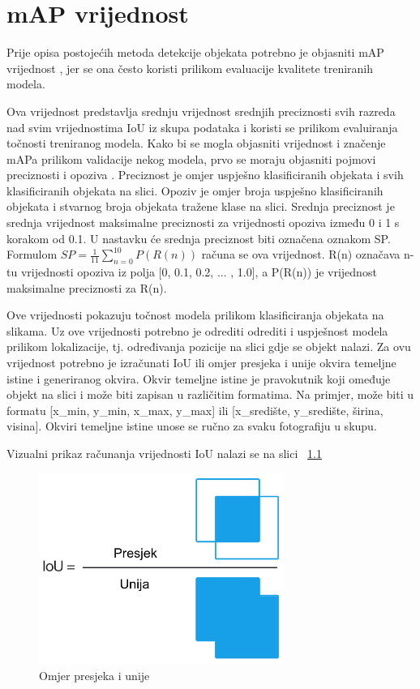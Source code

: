 \chapter{mAP vrijednost}

Prije opisa postojećih metoda detekcije objekata potrebno je objasniti mAP vrijednost , jer se ona često koristi prilikom evaluacije
kvalitete treniranih modela.

Ova vrijednost predstavlja srednju vrijednost srednjih preciznosti svih razreda nad svim
vrijednostima IoU iz skupa podataka i koristi se prilikom evaluiranja točnosti treniranog modela. 
Kako bi se mogla objasniti vrijednost i značenje mAPa prilikom validacije nekog modela, prvo se moraju objasniti pojmovi
preciznosti  i opoziva . Preciznost je omjer uspješno klasificiranih objekata i svih klasificiranih objekata na slici. 
Opoziv je omjer broja uspješno klasificiranih objekata i stvarnog broja objekata tražene klase na slici. 
Srednja preciznost  je srednja vrijednost maksimalne preciznosti za vrijednosti opoziva između 0 i 1 s korakom 
od 0.1. U nastavku će srednja preciznost biti označena oznakom SP. \newline 
Formulom  $SP=\frac{1}{11}\sum_{n=0}^{10} P(R(n))$ računa se ova vrijednost. R(n) označava n-tu vrijednosti opoziva iz polja [0, 0.1, 0.2, ... , 1.0], a 
P(R(n)) je vrijednost maksimalne preciznosti za R(n). \citep{everingham2010pascal}

Ove vrijednosti pokazuju točnost modela prilikom klasificiranja objekata na slikama. Uz ove vrijednosti potrebno je odrediti odrediti i uspješnost modela prilikom lokalizacije, tj. 
određivanja pozicije na slici gdje se objekt nalazi. Za ovu vrijednost potrebno je izračunati IoU  ili omjer presjeka i unije okvira temeljne istine i 
generiranog okvira. Okvir temeljne istine je pravokutnik koji omeđuje objekt na slici i može biti zapisan u različitim formatima. Na primjer, može biti u formatu 
[x\_min, y\_min, x\_max, y\_max] ili [x\_središte, y\_središte, širina, visina]. Okviri temeljne istine unose se ručno za svaku fotografiju u skupu. \newline

Vizualni prikaz računanja vrijednosti IoU nalazi se na slici ~\ref{IoU}

\begin{figure}[htb]
    \centering
    \includegraphics[width=8cm]{img/iou_equation.png}
    \caption{Omjer presjeka i unije}
    \label{IoU}
\end{figure}

